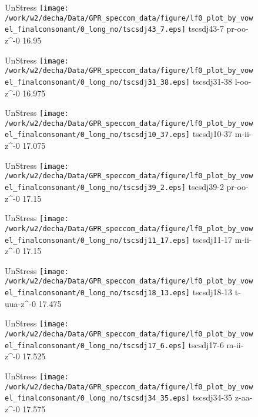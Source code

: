 \documentclass{article}
\begin{document}
\begin{figure}[t]
\begin{minipage}[b]{.24\textwidth}
UnStress
\centering
\texttt{[image: /work/w2/decha/Data/GPR\_speccom\_data/figure/lf0\_plot\_by\_vowel\_finalconsonant/0\_long\_no/tscsdj43\_7.eps]}
tscsdj43-7 pr-oo-z\textasciicircum-0 16.95
\end{minipage}
\begin{minipage}[b]{.24\textwidth}
UnStress
\centering
\texttt{[image: /work/w2/decha/Data/GPR\_speccom\_data/figure/lf0\_plot\_by\_vowel\_finalconsonant/0\_long\_no/tscsdj31\_38.eps]}
tscsdj31-38 l-oo-z\textasciicircum-0 16.975
\end{minipage}
\begin{minipage}[b]{.24\textwidth}
UnStress
\centering
\texttt{[image: /work/w2/decha/Data/GPR\_speccom\_data/figure/lf0\_plot\_by\_vowel\_finalconsonant/0\_long\_no/tscsdj10\_37.eps]}
tscsdj10-37 m-ii-z\textasciicircum-0 17.075
\end{minipage}
\begin{minipage}[b]{.24\textwidth}
UnStress
\centering
\texttt{[image: /work/w2/decha/Data/GPR\_speccom\_data/figure/lf0\_plot\_by\_vowel\_finalconsonant/0\_long\_no/tscsdj39\_2.eps]}
tscsdj39-2 pr-oo-z\textasciicircum-0 17.15
\end{minipage}
\end{figure}

\begin{figure}[t]
\begin{minipage}[b]{.24\textwidth}
UnStress
\centering
\texttt{[image: /work/w2/decha/Data/GPR\_speccom\_data/figure/lf0\_plot\_by\_vowel\_finalconsonant/0\_long\_no/tscsdj11\_17.eps]}
tscsdj11-17 m-ii-z\textasciicircum-0 17.15
\end{minipage}
\begin{minipage}[b]{.24\textwidth}
UnStress
\centering
\texttt{[image: /work/w2/decha/Data/GPR\_speccom\_data/figure/lf0\_plot\_by\_vowel\_finalconsonant/0\_long\_no/tscsdj18\_13.eps]}
tscsdj18-13 t-uua-z\textasciicircum-0 17.475
\end{minipage}
\begin{minipage}[b]{.24\textwidth}
UnStress
\centering
\texttt{[image: /work/w2/decha/Data/GPR\_speccom\_data/figure/lf0\_plot\_by\_vowel\_finalconsonant/0\_long\_no/tscsdj17\_6.eps]}
tscsdj17-6 m-ii-z\textasciicircum-0 17.525
\end{minipage}
\begin{minipage}[b]{.24\textwidth}
UnStress
\centering
\texttt{[image: /work/w2/decha/Data/GPR\_speccom\_data/figure/lf0\_plot\_by\_vowel\_finalconsonant/0\_long\_no/tscsdj34\_35.eps]}
tscsdj34-35 z-aa-z\textasciicircum-0 17.575
\end{minipage}
\end{figure}
\end{document}
